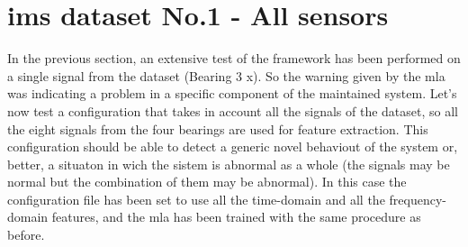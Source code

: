 \section{\gls{ims} dataset No.1 - All sensors}
In the previous section, an extensive test of the framework has been performed on a single signal from the dataset (Bearing 3 x). So the warning given by the \gls{mla} was indicating a problem in a specific component of the maintained system. Let's now test a configuration that takes in account all the signals of the dataset, so all the eight signals from the four bearings are used for feature extraction. This configuration should be able to detect a generic novel behaviout of the system or, better, a situaton in wich the sistem is abnormal as a whole (the signals may be normal but the combination of them may be abnormal).  In this case the configuration file has been set to use all the time-domain and all the frequency-domain features, and the \gls{mla} has been trained with the same procedure as before. 
\todo